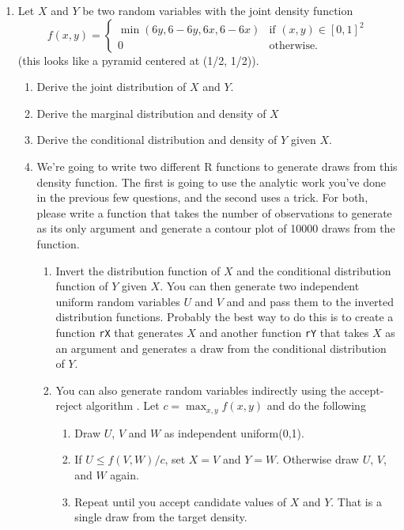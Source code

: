 \begin{enumerate}
\item Let $X$ and $Y$ be two random variables with the joint density
  function
  \begin{equation*}
    f(x, y) = \begin{cases}
      \min(6 y, 6 - 6y, 6 x, 6 - 6 x) & \text{if } (x, y) \in [0,1]^2 \\
      0 & \text{otherwise.}
    \end{cases}
  \end{equation*}
  (this looks like a pyramid centered at (1/2, 1/2)).
  \begin{enumerate}
  \item Derive the joint distribution of $X$ and $Y$.
  \item Derive the marginal distribution and density of $X$
  \item Derive the conditional distribution and density of $Y$ given
    $X$.
  \item We're going to write two different R functions to generate
    draws from this density function. The first is going to use the
    analytic work you've done in the previous few questions, and the
    second uses a trick. For both, please write a function that takes
    the number of observations to generate as its only argument and
    generate a contour plot of 10000 draws from the function.
    \begin{enumerate}
    \item Invert the distribution function of $X$ and the conditional
      distribution function of $Y$ given $X$. You can then generate
      two independent uniform random variables $U$ and $V$ and and
      pass them to the inverted distribution functions. Probably the
      best way to do this is to create a function \texttt{rX} that
      generates $X$ and another function \texttt{rY} that takes $X$ as
      an argument and generates a draw from the conditional
      distribution of $Y$.
    \item You can also generate random variables indirectly using the
      accept-reject algorithm \citep[Section 5.6.2]{CB02}. Let $c =
      \max_{x,y} f(x,y)$ and do the following
      \begin{enumerate}
      \item Draw $U$, $V$ and $W$ as independent uniform(0,1).
      \item If $U \leq f(V,W) / c$, set $X=V$ and $Y=W$.  Otherwise draw
        $U$, $V$, and $W$ again.
      \item Repeat until you accept candidate values of $X$ and
        $Y$. That is a single draw from the target density.
      \end{enumerate}
    \end{enumerate}


\end{enumerate}
\end{enumerate}
